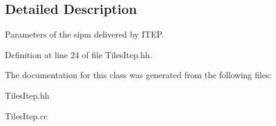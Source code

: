 \subsection{Detailed Description}
Parameters of the sipm delivered by I\-T\-E\-P. 

Definition at line 24 of file Tiles\-Itep.\-hh.



The documentation for this class was generated from the following files\-:\begin{DoxyCompactItemize}
\item 
Tiles\-Itep.\-hh\item 
Tiles\-Itep.\-cc\end{DoxyCompactItemize}
